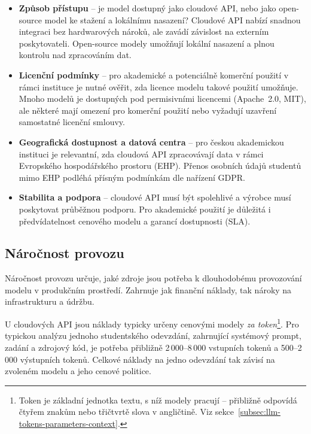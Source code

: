 \begin{itemize}
    \item \textbf{Způsob přístupu} -- je model dostupný jako cloudové API, nebo jako open-source model ke stažení a lokálnímu nasazení?
    Cloudové API nabízí snadnou integraci bez hardwarových nároků, ale zavádí závislost na externím poskytovateli.
    Open-source modely umožňují lokální nasazení a plnou kontrolu nad zpracováním dat.

    \item \textbf{Licenční podmínky} -- pro akademické a potenciálně komerční použití v rámci instituce je nutné ověřit, zda licence modelu takové použití umožňuje.
    Mnoho modelů je dostupných pod permisivními licencemi (Apache~2.0, MIT), ale některé mají omezení pro komerční použití nebo vyžadují uzavření samostatné licenční smlouvy.

    \item \textbf{Geografická dostupnost a datová centra} -- pro českou akademickou instituci je relevantní, zda cloudová API zpracovávají data v rámci Evropského hospodářského prostoru (EHP).
    Přenos osobních údajů studentů mimo EHP podléhá přísným podmínkám dle nařízení GDPR.

    \item \textbf{Stabilita a podpora} -- cloudové API musí být spolehlivé a výrobce musí poskytovat průběžnou podporu.
    Pro akademické použití je důležitá i předvídatelnost cenového modelu a garancí dostupnosti (SLA).
\end{itemize}

\subsection{Náročnost provozu}
\label{subsec:criteria-operational-cost}

Náročnost provozu určuje, jaké zdroje jsou potřeba k dlouhodobému provozování modelu v produkčním prostředí.
Zahrnuje jak finanční náklady, tak nároky na infrastrukturu a údržbu.

U cloudových API jsou náklady typicky určeny cenovými modely \emph{za token}\footnote{Token je základní jednotka textu, s níž modely pracují -- přibližně odpovídá čtyřem znakům nebo třičtvrtě slova v angličtině. Viz sekce~\ref{subsec:llm-tokens-parameters-context}.}.
Pro typickou analýzu jednoho studentského odevzdání, zahrnující systémový prompt, zadání a zdrojový kód, je potřeba přibližně 2\,000--8\,000 vstupních tokenů a 500--2\,000 výstupních tokenů.
Celkové náklady na jedno odevzdání tak závisí na zvoleném modelu a jeho cenové politice.

